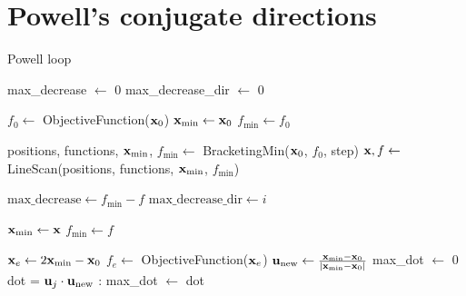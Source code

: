 \section{Powell's conjugate directions}
\begin{algorithm}
    \caption{Powell loop}\label{alg:powell}
    \begin{algorithmic}[1]
        \State max\_decrease $\gets$ 0
        \State max\_decrease\_dir $\gets$ 0

        \State $f_0\gets$ ObjectiveFunction($\vb{x}_0$)
        \State $\vb{x}_{\text{min}}\gets \vb{x}_0$
        \State $f_{\text{min}}\gets f_0$

            \State positions, functions, $\vb{x}_{\text{min}}$, $f_{\text{min}}\gets  $ BracketingMin($\vb{x}_0$, $f_0$, step)
            \State $\vb{x}, f \gets$ LineScan(positions, functions, $\vb{x}_{\text{min}}$, $f_{\text{min}}$)

                \State $ \text{max\_decrease}\gets f_{\text{min}} - f$
                \State $ \text{max\_decrease\_dir}\gets i$
            \EndIf

            \State $\vb{x}_{\text{min}}\gets \vb{x}$
            \State $f_{\text{min}}\gets f$

            \State $\vb{x}_e\gets 2 \vb{x}_{\text{min}} - \vb{x}_0$
            \State $f_e \gets$ ObjectiveFunction($\vb{x}_e$)
            \State $\vb{u}_{\text{new}} \gets \frac{\vb{x}_{\text{min}}-\vb{x}_0}{|\vb{x}_{\text{min}}-\vb{x}_0|}$
            \State max\_dot $\gets$ 0
            \State dot = $\vb{u}_j\cdot \vb{u}_{\text{new}}$
            :
                \State max\_dot $\gets$ dot
            \EndIf
            \EndFor


\end{algorithmic}
\end{algorithm}
